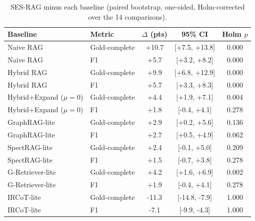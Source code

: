 \begin{table}[t]
\centering
\caption{SES-RAG minus each baseline (paired bootstrap, one-sided, Holm-corrected over the 14 comparisons).}
\label{tab:tests}
\small
\begin{tabular}{llccc}
\toprule
Baseline & Metric & $\Delta$ (pts) & 95\% CI & Holm $p$ \\
\midrule
Naive RAG & Gold-complete & +10.7 & [+7.5, +13.8] & 0.000 \\
Naive RAG & F1 & +5.7 & [+3.2, +8.2] & 0.000 \\
Hybrid RAG & Gold-complete & +9.9 & [+6.8, +12.9] & 0.000 \\
Hybrid RAG & F1 & +5.7 & [+3.3, +8.3] & 0.000 \\
Hybrid+Expand ($\mu{=}0$) & Gold-complete & +4.4 & [+1.9, +7.1] & 0.004 \\
Hybrid+Expand ($\mu{=}0$) & F1 & +1.8 & [-0.4, +4.1] & 0.278 \\
GraphRAG-lite & Gold-complete & +2.9 & [+0.2, +5.6] & 0.136 \\
GraphRAG-lite & F1 & +2.7 & [+0.5, +4.9] & 0.062 \\
SpectRAG-lite & Gold-complete & +2.4 & [-0.1, +5.0] & 0.209 \\
SpectRAG-lite & F1 & +1.5 & [-0.7, +3.8] & 0.278 \\
G-Retriever-lite & Gold-complete & +4.2 & [+1.6, +6.9] & 0.002 \\
G-Retriever-lite & F1 & +1.9 & [-0.4, +4.1] & 0.278 \\
IRCoT-lite & Gold-complete & -11.3 & [-14.8, -7.9] & 1.000 \\
IRCoT-lite & F1 & -7.1 & [-9.9, -4.3] & 1.000 \\
\bottomrule
\end{tabular}
\end{table}